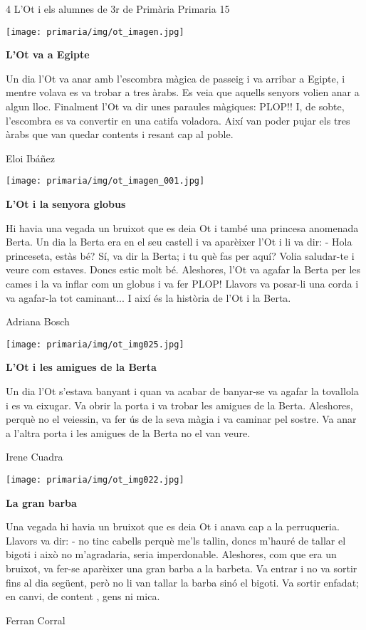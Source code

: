\begin{news}
{4} %
{L’Ot i els alumnes de 3r de Primària}
{}
{Primaria}
{15} %


\noindent\texttt{[image: primaria/img/ot\_imagen.jpg]}

\bf L’Ot va a Egipte

\rm
Un dia l’Ot va anar amb l’escombra màgica de passeig i va arribar a Egipte, i mentre volava es va trobar a tres àrabs. Es veia que aquells senyors volien anar a  algun lloc. Finalment l’Ot va dir unes paraules màgiques: PLOP!! I, de sobte, l’escombra es va convertir en una catifa voladora. Així van poder pujar els tres àrabs que van quedar contents i resant cap al poble.

                                      Eloi Ibáñez           


\noindent\texttt{[image: primaria/img/ot\_imagen\_001.jpg]}

\bf L’Ot i la senyora globus

\rm
Hi havia una vegada un bruixot que es deia Ot i també una princesa anomenada Berta. Un dia la Berta era en el seu castell i va aparèixer l’Ot i li va dir: 
-   Hola princeseta, estàs bé? 
Sí, va dir la Berta; i tu què fas per aquí?
Volia saludar-te i  veure com estaves.
Doncs estic molt bé.
Aleshores, l’Ot va agafar la Berta per les cames i la va inflar com un globus i va fer PLOP! Llavors va posar-li una corda i va agafar-la tot caminant... I així és la història de l’Ot i la Berta.
     
                                                           Adriana Bosch


\noindent\texttt{[image: primaria/img/ot\_img025.jpg]}

\bf L’Ot i les amigues de la Berta

\rm
Un dia l’Ot s’estava banyant i quan va acabar de banyar-se va agafar la tovallola i es va eixugar. Va obrir la porta i va trobar les amigues de la Berta. Aleshores, perquè no el veiessin, va fer ús de la seva màgia i va caminar pel sostre. Va anar a l’altra porta i les amigues de la Berta no el van veure.

                                                                Irene Cuadra

\noindent\texttt{[image: primaria/img/ot\_img022.jpg]}

\bf La gran barba

\rm

Una vegada hi havia un bruixot que es deia Ot i anava cap a la perruqueria. Llavors va dir: - no tinc cabells perquè me’ls tallin, doncs m’hauré de tallar el bigoti i això no m’agradaria, seria imperdonable. Aleshores, com que era un bruixot, va fer-se aparèixer una gran barba a la barbeta. Va entrar i no va sortir fins al dia següent, però no li van tallar la barba sinó el bigoti. Va sortir enfadat; en canvi,  de content , gens ni mica.

                                                             Ferran Corral 


\end{news}

